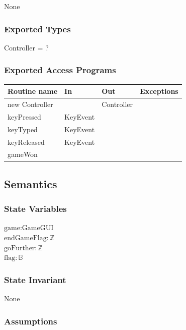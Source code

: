 \documentclass[12pt]{article}
\begin{document}
None

\subsubsection* {Exported Types}

Controller = ?

\subsubsection* {Exported Access Programs}

\begin{tabular}{| l | l | l | p{5cm} |}
  \hline
  \textbf{Routine name} & \textbf{In} & \textbf{Out} & \textbf{Exceptions}\\
  \hline
  new Controller & & Controller & \\
  \hline
  keyPressed & KeyEvent & & ~\\
  \hline
  keyTyped & KeyEvent & & ~\\
  \hline
  keyReleased & KeyEvent & & ~\\
  \hline
  gameWon & & & ~\\
  \hline
  
\end{tabular}

\subsection* {Semantics}

\subsubsection* {State Variables}

$\text{game}: \text{GameGUI}$\\
$\text{endGameFlag}: \mathbb{Z}$\\
$\text{goFurther}: \mathbb{Z}$\\
$\text{flag}: \mathbb{B}$\\

\subsubsection* {State Invariant}

None

\subsubsection* {Assumptions}
\end{document}
